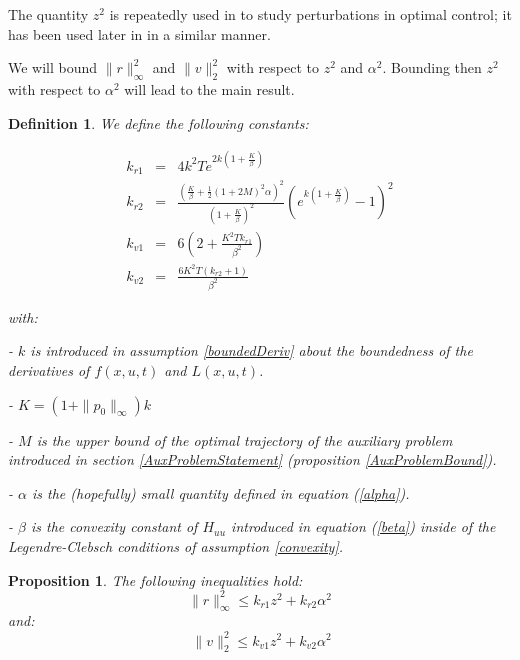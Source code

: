 \documentclass[a4paper,10pt]{article}
\newtheorem{definition}{Definition}
\newtheorem{proposition}{Proposition}
\begin{document}
The quantity $z^{2}$ is repeatedly used in \cite{bensPert} to study 
perturbations in optimal control; it has been used later in \cite{maamria} 
in a similar manner.

We will bound $\|r\|_{\infty}^{2}$ and $\|v\|_{2}^{2}$ with respect to $z^{2}$ and 
$\alpha^{2}$. Bounding then $z^{2}$ with respect to $\alpha^{2}$ will 
lead to the main result.
\begin{definition}\label{krv12definition}
    We define the following constants:
    
    \begin{eqnarray*}
         k_{r1} & =  & 4 k^{2}T e^{2k\left(1+\frac{K}{\beta}\right)} 
         \\
         k_{r2} & = & \frac{\left(\frac{K}{\beta}+\frac{1}{2}(1+2M)^{2} 
         \alpha\right)^{2}}{\left(1+\frac{K}{\beta}\right)^{2}} 
         \left(e^{k\left(1+\frac{K}{\beta}\right)}-1\right)^{2}
         \\
         k_{v1} & = & 6\left( 2 + \frac{K^{2}T k_{r1}}{\beta^{2}}\right) 
          \\
          k_{v2} & =  &\frac{6K^{2}T(k_{r2}+1)}{\beta^{2}}
     \end{eqnarray*}
	 
	with:
	
	- $k$ is introduced in assumption \ref{boundedDeriv} about 
	the boundedness of the derivatives of $f(x,u,t)$ and $L(x,u,t)$.
	
	- $K=(1+\|p_{0}\|_{\infty}) k$ 
	
	- $M$ is the upper bound of the optimal trajectory of the 
	auxiliary problem introduced in section \ref{AuxProblemStatement} 
	(proposition \ref{AuxProblemBound}).
	
	- $\alpha$ is the (hopefully) small quantity defined in equation 
	(\ref{alpha}).
	
	- $\beta$ is the convexity constant of $H_{uu}$ introduced in equation 
	(\ref{beta}) inside of the Legendre-Clebsch conditions of 
	assumption \ref{convexity}.
	
\end{definition}
\begin{proposition}\label{vrinequalities}
    The following inequalities hold:
\begin{equation}
        \|r\|_{\infty}^{2} \leq k_{r1}z^{2} + k_{r2} \alpha^{2} 
    \label{rinequality}
\end{equation}
and: 
\begin{equation}\
    \|v\|_{2}^{2} \leq k_{v1} z^{2} + k_{v2} \alpha^{2}
    \label{vinequality}
\end{equation}
\end{proposition}
\end{document}
